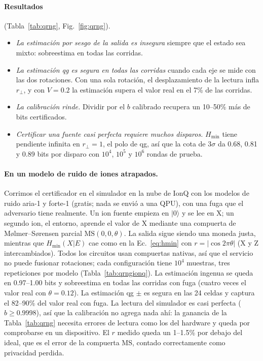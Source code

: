 \documentclass[11pt]{article}
\begin{document}
\paragraph{Resultados} (Tabla~\ref{tab:qrng}, Fig.~\ref{fig:qrng}).
\begin{itemize}
\item \emph{La estimación por sesgo de la salida es insegura} siempre que el estado sea mixto: sobreestima en
todas las corridas.
\item \emph{La estimación qg es segura en todas las corridas} cuando cada eje se mide con las dos
rotaciones. Con una sola rotación, el desplazamiento de la lectura infla $r_\perp$, y con $V=0.2$ la
estimación supera el valor real en el 7\% de las corridas.
\item \emph{La calibración rinde.} Dividir por el $b$ calibrado recupera un 10--50\% más de bits
certificados.
\item \emph{Certificar una fuente casi perfecta requiere muchos disparos.} $H_{\min}$ tiene pendiente
infinita en $r_\perp=1$, el polo de qg, así que la cota de $3\sigma$ da 0.68, 0.81 y 0.89 bits por disparo
con $10^4$, $10^5$ y $10^6$ rondas de prueba.
\end{itemize}

\paragraph{En un modelo de ruido de iones atrapados.} Corrimos el certificador en el simulador en la nube de
IonQ con los modelos de ruido aria-1 y forte-1 (gratis; nada se envió a una QPU), con una fuga que el
adversario tiene realmente. Un ion fuente empieza en $|0\rangle$ y se lee en X; un segundo ion, el entorno,
aprende el valor de X mediante una compuerta de M{\o}lmer--S{\o}rensen parcial $\mathrm{MS}(0,0,\theta)$. La
salida sigue siendo una moneda justa, mientras que $H_{\min}(X|E)$ cae como en la Ec.~\eqref{eq:hmin} con
$r=|\cos2\pi\theta|$ (X y Z intercambiados). Todos los circuitos usan compuertas nativas, así que el
servicio no puede fusionar rotaciones; cada configuración tiene $10^4$ muestras, tres repeticiones por
modelo (Tabla~\ref{tab:qrngionq}). La estimación ingenua se queda en 0.97--1.00 bits y sobreestima en todas
las corridas con fuga (cuatro veces el valor real con $\theta=0.12$). La estimación qg $\pm$ es segura en
las 24 celdas y captura el 82--90\% del valor real con fuga. La lectura del simulador es casi perfecta
($b\ge0.9998$), así que la calibración no agrega nada ahí: la ganancia de la Tabla~\ref{tab:qrng} necesita
errores de lectura como los del hardware y queda por comprobarse en un dispositivo. El $r$ medido queda un
1--1.5\% por debajo del ideal, que es el error de la compuerta MS, contado correctamente como privacidad
perdida.
\end{document}
